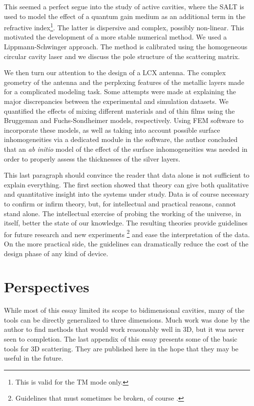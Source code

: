 This seemed a perfect segue into the study of active cavities, where
the SALT is used to model the effect of a quantum gain medium as
an additional term in the refractive index\footnote{This is valid for the TM
mode only.}. The latter is dispersive and complex, possibly non-linear.
This motivated the development of a more stable numerical method. 
We used a Lippmann-Schwinger approach. The method is calibrated using
the homogeneous circular cavity laser and we discuss the pole structure
of the scattering matrix.

We then turn our attention to the design of a LCX antenna. The complex
geometry of the antenna and the perplexing features of the metallic
layers made for a complicated modeling task. Some attempts were made
at explaining the major discrepancies between the experimental
and simulation datasets. We quantified the effects of mixing
different materials and of thin films using the Bruggeman
and Fuchs-Sondheimer models, respectively. Using FEM software
to incorporate these models, as well as taking into account
possible surface inhomogeneities via a dedicated module in the
software, the author concluded that an \textit{ab initio}
model of the effect of the surface inhomogeneities was needed
in order to properly assess the thicknesses of the silver layers.

This last paragraph should convince the reader that data alone is 
not sufficient to explain everything. The first section showed that
theory can give both qualitative and quantitative insight into
the systems under study. Data is of course necessary to confirm 
or infirm theory, but, for intellectual and practical reasons, cannot
stand alone. The intellectual exercise of probing the working of the 
universe, in itself, better the state of our knowledge. The resulting
theories provide guidelines for future research and new experiments
\footnote{Guidelines that must sometimes be broken, of course \cite{KUH1996}.}
and ease the interpretation of the data. On the more practical side, the 
guidelines can dramatically reduce the cost of the design phase of 
any kind of device. 

\section{Perspectives}
While most of this essay limited its scope to bidimensional cavities, 
many of the tools can be directly generalized to three dimensions. Much
work was done by the author to find methods that would work reasonably
well in 3D, but it was never seen to completion. The last appendix of this
essay presents some of the basic tools for 3D scattering. They are published
here in the hope that they may be useful in the future. 

